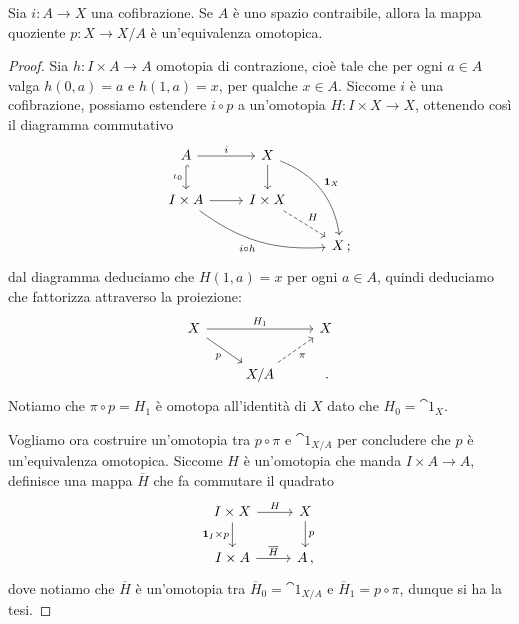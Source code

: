 \begin{prop}\label{contr-htp}
	Sia $i:A \to X$ una cofibrazione. Se $A$ è uno spazio contraibile, allora
	la mappa quoziente $p:X \to X/A$ è un'equivalenza omotopica.
	\begin{proof}
		Sia $h:I \times A \to A$ omotopia di contrazione, cioè
		tale che per ogni $a \in A$ valga $h(0,a) = a$ e $h(1,a) = x$,
		per qualche $x \in A$. Siccome $i$ è una cofibrazione,
		possiamo estendere $i \circ p$ a un'omotopia $H:I \times X \to X$,
		ottenendo così il diagramma commutativo
		\begin{equation*}
		\begin{tikzcd}
			A  \ar[r, "i"]
			 \ar[d, hook, "\iota_{0}"'] 
			 & X \ar[d]  \ar[ddr, bend left, "\cat{1}_{X}"] & \\
			I \times A \ar[r]  \ar[drr, bend right=20pt, "i \circ h"']
			& I \times X \ar[dr, dashed, "H"] & \\
			& & X \,;
		\end{tikzcd}
		\end{equation*}
		dal diagramma deduciamo che $H(1,a) = x$ per ogni $a \in A$,
		quindi deduciamo che fattorizza attraverso la proiezione:
		\begin{equation*}
			\begin{tikzcd}
				X \ar[rr, "H_{1}"] \ar[dr, "p"'] & & X \\
				& X/A \ar[ur, dashed, "\pi"'] & \,.
			\end{tikzcd}
		\end{equation*}
		Notiamo che $\pi \circ p = H_{1}$ è omotopa all'identità di $X$
		dato che $H_{0} = \cat{1}_{X}$.
		
		Vogliamo ora costruire un'omotopia tra $p \circ \pi$ e $\cat{1}_{X/A}$
		per concludere che $p$ è un'equivalenza omotopica. 
		Siccome $H$ è un'omotopia che manda $I \times A \to A$,
		definisce una mappa $\overline{H}$ che fa commutare il quadrato
		\begin{equation*}
			\begin{tikzcd}
				I \times X \ar[r, "H"] \ar[d, "\cat{1}_{I} \times p"']
				& X \ar[d, "p"] \\
				I \times A \ar[r, "\overline{H}"] & A\,,
			\end{tikzcd}
		\end{equation*}
		dove notiamo che $\overline{H}$ è un'omotopia tra 
		$\overline{H}_{0} = \cat{1}_{X/A}$ e $\overline{H}_{1}=p \circ \pi$,
		dunque si ha la tesi.
	\end{proof}
\end{prop}


